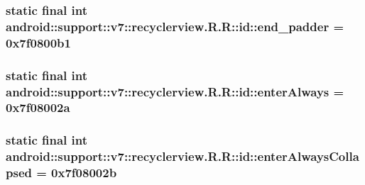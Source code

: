 \hypertarget{classandroid_1_1support_1_1v7_1_1recyclerview_1_1_r_1_1id_def464c4e7e38560695917154979db45}{
\subsubsection[{end\_\-padder}]{\setlength{\rightskip}{0pt plus 5cm}static final int android::support::v7::recyclerview.R.R::id::end\_\-padder = 0x7f0800b1}}
\label{classandroid_1_1support_1_1v7_1_1recyclerview_1_1_r_1_1id_def464c4e7e38560695917154979db45}


\hypertarget{classandroid_1_1support_1_1v7_1_1recyclerview_1_1_r_1_1id_f1a25a52393e391246ae639100e32963}{
\subsubsection[{enterAlways}]{\setlength{\rightskip}{0pt plus 5cm}static final int android::support::v7::recyclerview.R.R::id::enterAlways = 0x7f08002a}}
\label{classandroid_1_1support_1_1v7_1_1recyclerview_1_1_r_1_1id_f1a25a52393e391246ae639100e32963}


\hypertarget{classandroid_1_1support_1_1v7_1_1recyclerview_1_1_r_1_1id_abb89aaaade28422bebab39c232a2321}{
\subsubsection[{enterAlwaysCollapsed}]{\setlength{\rightskip}{0pt plus 5cm}static final int android::support::v7::recyclerview.R.R::id::enterAlwaysCollapsed = 0x7f08002b}}
\label{classandroid_1_1support_1_1v7_1_1recyclerview_1_1_r_1_1id_abb89aaaade28422bebab39c232a2321}


